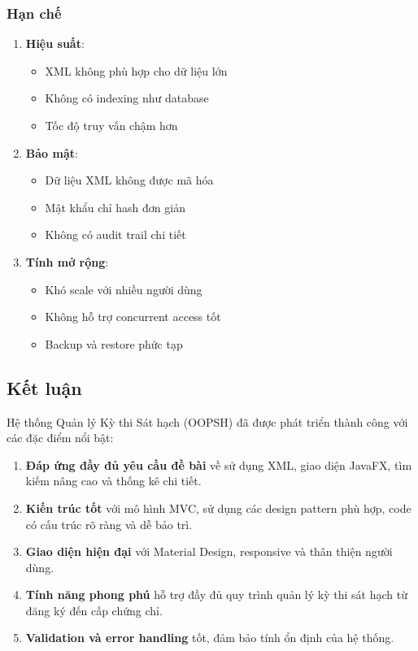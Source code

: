 \documentclass[12pt,a4paper]{article}
\begin{document}
\subsubsection{Hạn chế}

\begin{enumerate}
    \item \textbf{Hiệu suất}:
    \begin{itemize}
        \item XML không phù hợp cho dữ liệu lớn
        \item Không có indexing như database
        \item Tốc độ truy vấn chậm hơn
    \end{itemize}
    
    \item \textbf{Bảo mật}:
    \begin{itemize}
        \item Dữ liệu XML không được mã hóa
        \item Mật khẩu chỉ hash đơn giản
        \item Không có audit trail chi tiết
    \end{itemize}
    
    \item \textbf{Tính mở rộng}:
    \begin{itemize}
        \item Khó scale với nhiều người dùng
        \item Không hỗ trợ concurrent access tốt
        \item Backup và restore phức tạp
    \end{itemize}
\end{enumerate}

\subsection{Kết luận}

Hệ thống Quản lý Kỳ thi Sát hạch (OOPSH) đã được phát triển thành công với các đặc điểm nổi bật:

\begin{enumerate}
    \item \textbf{Đáp ứng đầy đủ yêu cầu đề bài} về sử dụng XML, giao diện JavaFX, tìm kiếm nâng cao và thống kê chi tiết.
    
    \item \textbf{Kiến trúc tốt} với mô hình MVC, sử dụng các design pattern phù hợp, code có cấu trúc rõ ràng và dễ bảo trì.
    
    \item \textbf{Giao diện hiện đại} với Material Design, responsive và thân thiện người dùng.
    
    \item \textbf{Tính năng phong phú} hỗ trợ đầy đủ quy trình quản lý kỳ thi sát hạch từ đăng ký đến cấp chứng chỉ.
    
    \item \textbf{Validation và error handling} tốt, đảm bảo tính ổn định của hệ thống.
\end{enumerate}
\end{document}
